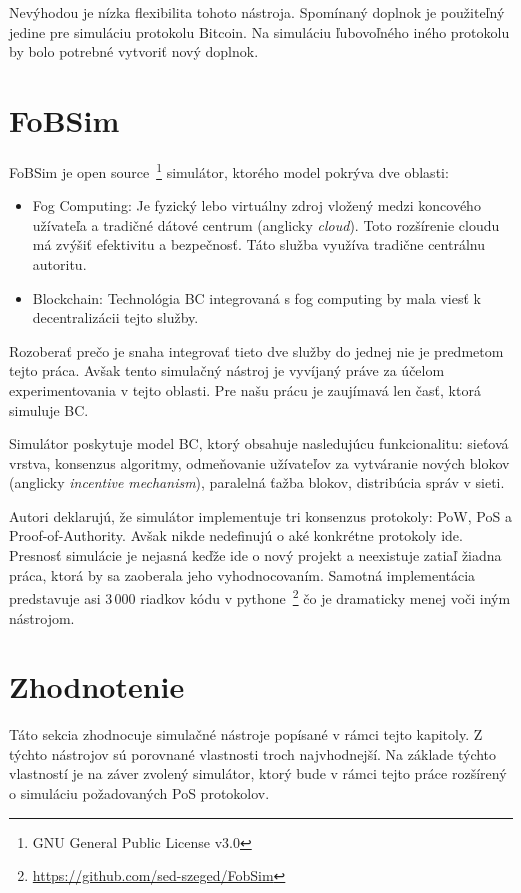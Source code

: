 Nevýhodou je nízka flexibilita tohoto nástroja. Spomínaný doplnok je použiteľný jedine pre simuláciu protokolu Bitcoin. Na simuláciu ľubovoľného iného protokolu by bolo potrebné vytvoriť nový doplnok.~\cite{shadowBitcoin}

\section{FoBSim}

FoBSim je open source~\footnote{GNU General Public License v3.0} simulátor, ktorého model pokrýva dve oblasti:
\begin{itemize}
	\item Fog Computing: Je fyzický lebo virtuálny zdroj vložený medzi koncového užívateľa a tradičné dátové centrum (anglicky \textit{cloud}). Toto rozšírenie cloudu má zvýšiť efektivitu a bezpečnosť. Táto služba využíva tradične centrálnu autoritu.
	\item Blockchain: Technológia BC integrovaná s fog computing by mala viesť k decentralizácii tejto služby.
\end{itemize}
Rozoberať prečo je snaha integrovať tieto dve služby do jednej nie je predmetom tejto práca. Avšak tento simulačný nástroj je vyvíjaný práve za účelom experimentovania v tejto oblasti. Pre našu prácu je zaujímavá len časť, ktorá simuluje BC.

Simulátor poskytuje model BC, ktorý obsahuje nasledujúcu funkcionalitu: sieťová vrstva, konsenzus algoritmy, odmeňovanie užívateľov za vytváranie nových blokov (anglicky \textit{incentive mechanism}), paralelná ťažba blokov, distribúcia správ v sieti.~\cite{fobsimWp}

Autori deklarujú, že simulátor implementuje tri konsenzus protokoly: PoW, PoS a Proof-of-Authority. Avšak nikde nedefinujú o aké konkrétne protokoly ide. Presnosť simulácie je nejasná keďže ide o nový projekt a neexistuje zatiaľ žiadna práca, ktorá by sa zaoberala jeho vyhodnocovaním. Samotná implementácia predstavuje asi 3\,000 riadkov kódu v pythone~\footnote{\url{https://github.com/sed-szeged/FobSim}} čo je dramaticky menej voči iným nástrojom. 

\section{Zhodnotenie}

Táto sekcia zhodnocuje simulačné nástroje popísané v rámci tejto kapitoly. Z týchto nástrojov sú porovnané vlastnosti troch najvhodnejší. Na základe týchto vlastností je na záver zvolený simulátor, ktorý bude v rámci tejto práce rozšírený o simuláciu požadovaných PoS protokolov.

